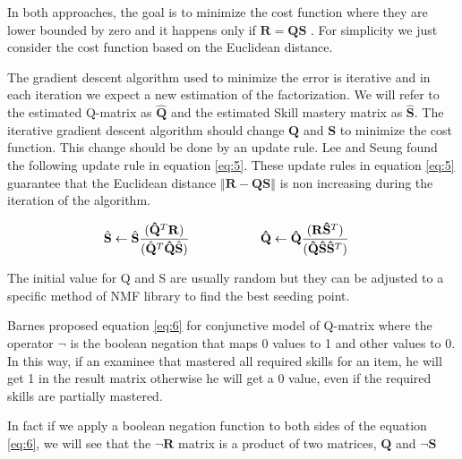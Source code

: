 In both approaches, the goal is to minimize the cost function where they are lower bounded by zero and it happens only if $\mathbf{R}=\mathbf{Q}\mathbf{S}$ \citep{seung2001algorithms}. For simplicity we just consider the cost function based on the Euclidean distance.

The gradient descent algorithm used to minimize the error is iterative and in each iteration we expect a new estimation of the factorization. We will refer to the estimated Q-matrix{ as} $\hat{\mathbf{Q}}$ and{ the} estimated Skill mastery matrix{ as} $\hat{\mathbf{S}}$.  The iterative gradient descent algorithm should change $\mathbf{Q}$ and $\mathbf{S}$ to minimize the cost function. This change should be done by an update rule. Lee and Seung \citep{seung2001algorithms} found the following update rule in equation \eqref{eq:5}. These update rules in equation \eqref{eq:5} guarantee that the Euclidean distance $\left\Vert \mathbf{R}-\mathbf{Q}\mathbf{S}\right\Vert $ is non increasing during the iteration of the algorithm.

\begin{equation}
\begin{aligned}\hat{\mathbf{S}}\leftarrow\hat{\mathbf{S}}\frac{(\mathbf{\hat{Q}}^{T}\mathbf{R})}{(\hat{\mathbf{Q}}^{T}\mathbf{\hat{Q}}\hat{\mathbf{S}})}\end{aligned}
\hspace{20mm}\begin{aligned} & \mathbf{\hat{Q}}\leftarrow\mathbf{\hat{Q}}\frac{(\mathbf{R}\mathbf{\hat{\mathbf{S}}}^{T})}{(\mathbf{\hat{Q}}\mathbf{\hat{\mathbf{S}}}\mathbf{\hat{\mathbf{S}}}^{T})}\end{aligned}
\label{eq:5}
\end{equation}


The initial value for Q and S are usually random but they can be adjusted to a specific method of \ac{NMF} library to find the best seeding point.



Barnes \citep{Barnes2005} proposed equation \ref{eq:6} for conjunctive model of Q-matrix where the operator $\neg$ is the boolean negation that maps 0 values to 1 and other values to 0. In this way, if an examinee that mastered all required skills for an item, he will get 1 in the result matrix otherwise he will get a 0 value, even if the required skills are partially mastered.

In fact if we apply a boolean negation function to both sides of the equation \ref{eq:6}, we will see that the $\neg\mathbf{R}$ matrix is a product of two matrices, $\mathbf{Q}$ and $\neg\mathbf{S}$

